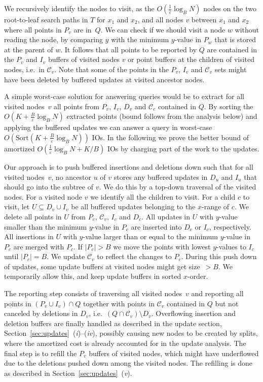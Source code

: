 \documentclass[11pt]{article}
\newcommand{\Sort}{\mathrm{Sort}}
\begin{document}
We recursively identify the nodes to visit, as the
$O(\frac{1}{\varepsilon}\log_B N)$ nodes on the two root-to-leaf
search paths in $T$ for $x_1$ and $x_2$, and all nodes $v$ between
$x_1$ and $x_2$ where all points in $P_v$ are in~$Q$.  We can check if
we should visit a node $w$ without reading the node, by comparing $y$
with the minimum $y$-value in $P_w$ that is stored at the parent of
$w$.  It follows that all points to be reported by $Q$ are contained
in the $P_v$ and $I_v$ buffers of visited nodes $v$ or point buffers
at the children of visited nodes, i.e.\ in $\mathcal{C}_v$. Note that
some of the points in the $P_v$, $I_v$ and $\mathcal{C}_v$ sets might
have been deleted by buffered updates at visited ancestor nodes.

A simple worst-case solution for answering queries would be to extract
for all visited nodes~$v$ all points from $P_v$, $I_v$, $D_v$ and
$\mathcal{C}_c$ contained in $Q$.  By sorting the
$O(K+\frac{B}{\varepsilon}\log_B N)$ extracted points (bound follows
from the analysis below) and applying the buffered updates we can
answer a query in worst-case $O(\Sort(K+\frac{B}{\varepsilon}\log_B
N))$ IOs.  In the following we prove the better bound of amortized
$O(\frac{1}{\varepsilon}\log_B N+K/B)$ IOs by charging part of the
work to the updates.

Our approach is to push buffered insertions and deletions down such
that for all visited nodes~$v$, no ancestor $u$ of $v$ stores any
buffered updates in $D_u$ and $I_u$ that should go into the subtree of
$v$. We do this by a top-down traversal of the visited nodes. For a
visited node $v$ we identify all the children to visit. For a child
$c$ to visit, let $U\subseteq D_v \cup I_v$ be all buffered updates
belonging to the $x$-range of $c$.  We delete all points in $U$ from
$P_c$, $\mathcal{C}_v$, $I_c$ and $D_c$. All updates in $U$ with
$y$-value smaller than the minimum $y$-value in $P_c$ are inserted
into $D_c$ or $I_c$, respectively. All insertions in $U$ with
$y$-value larger than or equal to the minimum $y$-value in $P_c$ are
merged with $P_c$.  If $|P_c|>B$ we move the points with lowest
$y$-values to $I_c$ until $|P_c|=B$.  We update $\mathcal{C}_v$ to
reflect the changes to $P_c$.  During this push down of updates, some
update buffers at visited nodes might get size~$>B$. We temporarily
allow this, and keep update buffers in sorted $x$-order.

The reporting step consists of traversing all visited nodes~$v$ and
reporting all points in $(P_v \cup I_v)\cap Q$ together with points in
$\mathcal{C}_v$ contained in $Q$ but not canceled by deletions in
$D_v$, i.e.\ $(Q\cap\mathcal{C}_v)\setminus D_v$.
%
Overflowing insertion and deletion buffers are finally handled as
described in the update section,
Section~\ref{sec:updates}~(\textit{i})--(\textit{iv}), possibly
causing new nodes to be created by splits, where the amortized cost is
already accounted for in the update analysis.
%
The final step is to refill the $P_v$ buffers of visited nodes, which
might have underflowed due to the deletions pushed down among the
visited nodes. The refilling is done as described in
Section~\ref{sec:updates}~(\textit{v}).
\end{document}
